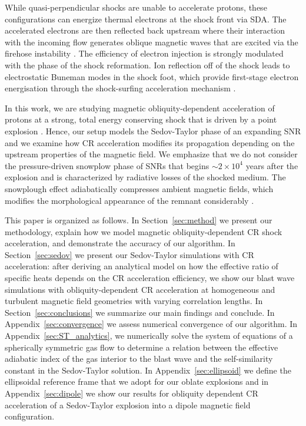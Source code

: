 \documentclass[8pt,a4paper,usenatbib]{mnras}
\begin{document}
While quasi-perpendicular shocks are unable to accelerate protons, these
configurations can energize thermal electrons at the shock front via SDA. The
accelerated electrons are then reflected back upstream where their interaction
with the incoming flow generates oblique magnetic waves that are excited via the
firehose instability \citep{2014ApJ...794..153G, 2014ApJ...797...47G}. The
efficiency of electron injection is strongly modulated with the phase of the
shock reformation. Ion reflection off of the shock leads to electrostatic
Buneman modes in the shock foot, which provide first-stage electron energisation
through the shock-surfing acceleration mechanism \citep{2017ApJ...847...71B}.

In this work, we are studying magnetic obliquity-dependent acceleration of
protons at a strong, total energy conserving shock that is driven by a
point explosion \citep[similar in spirit to the analytic model
  by][]{2012MNRAS.419.1421B}. Hence, our setup models the Sedov-Taylor phase of
an expanding SNR and we examine how CR acceleration modifies its propagation
depending on the upstream properties of the magnetic field.  We emphasize that
we do not consider the pressure-driven snowplow phase of SNRs that begins $\sim2
\times 10^4$ years after the explosion and is characterized by radiative losses
of the shocked medium. The snowplough effect adiabatically compresses ambient
magnetic fields, which modifies the morphological appearance of the remnant
considerably \citep{2015A&A...584A..49V}.

This paper is organized as follows. In Section~\ref{sec:method} we present our
methodology, explain how we model magnetic obliquity-dependent CR shock
acceleration, and demonstrate the accuracy of our algorithm.  In
Section~\ref{sec:sedov} we present our Sedov-Taylor simulations with CR
acceleration: after deriving an analytical model on how the effective ratio of
specific heats depends on the CR acceleration efficiency, we show our blast wave
simulations with obliquity-dependent CR acceleration at homogeneous and
turbulent magnetic field geometries with varying correlation lengths.  In
Section~\ref{sec:conclusions} we summarize our main findings and conclude.  In
Appendix~\ref{sec:convergence} we assess numerical convergence of our algorithm.
In Appendix~\ref{sec:ST_analytics}, we numerically solve the system of equations
of a spherically symmetric gas flow to determine a relation between the
effective adiabatic index of the gas interior to the blast wave and the
self-similarity constant in the Sedov-Taylor solution. In
Appendix~\ref{sec:ellipsoid} we define the ellipsoidal reference frame that we
adopt for our oblate explosions and in Appendix~\ref{sec:dipole} we show our
results for obliquity dependent CR acceleration of a Sedov-Taylor explosion into
a dipole magnetic field configuration.
\end{document}
